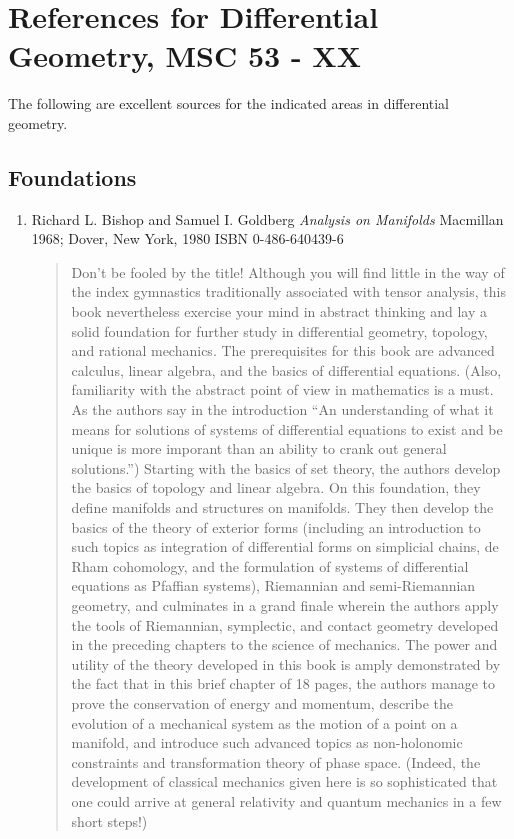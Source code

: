 \documentclass[12pt]{article}
\begin{document}
\section*{References for Differential Geometry, MSC 53 - XX}

The following are excellent sources for the indicated areas in differential geometry.

\subsection*{Foundations}
\begin{enumerate}
\item Richard L. Bishop and Samuel I. Goldberg \emph{ Analysis on Manifolds} Macmillan 1968; Dover, New York, 1980 ISBN 0-486-640439-6
\begin{quote}
Don't be fooled by the title!  Although you will find little in the way of the index gymnastics traditionally associated with tensor analysis, this book nevertheless exercise your mind in abstract thinking and lay a solid foundation for further study in differential geometry, topology, and rational mechanics.  The prerequisites for this book are advanced calculus, linear algebra, and the basics of differential equations.  (Also, familiarity with the abstract point of view in mathematics is a must.  As the authors say in the introduction ``An understanding of what it means for solutions of systems of differential equations to exist and be unique is more imporant than an ability to crank out general solutions.'') Starting with the basics of set theory, the authors develop the basics of topology and linear algebra.  On this foundation, they define manifolds and structures on manifolds.  They then develop the basics of the theory of exterior forms (including an introduction to such topics as integration of differential forms on simplicial chains, de Rham cohomology, and the formulation of systems of differential equations as Pfaffian systems), Riemannian and semi-Riemannian geometry, and culminates in a grand finale wherein the authors apply the tools of Riemannian, symplectic, and contact geometry developed in the preceding chapters to the science of mechanics.  The power and utility of the theory developed in this book is amply demonstrated by the fact that in this brief chapter of 18 pages, the authors manage to prove the conservation of energy and momentum, describe the evolution of a mechanical system as the motion of a point on a manifold, and introduce such advanced topics as non-holonomic constraints and transformation theory of phase space.  (Indeed, the development of classical mechanics given here is so sophisticated that one could arrive at general relativity and quantum mechanics in a few short steps!)

\end{quote}
\end{enumerate}
\end{document}
